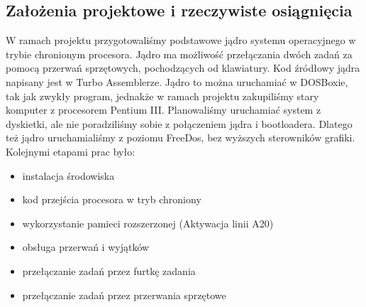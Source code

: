 \documentclass[a4paper,12pt]{article}
\begin{document}
		\subsection{Założenia projektowe i rzeczywiste osiągnięcia}
		W ramach projektu przygotowaliśmy podstawowe jądro systemu operacyjnego w trybie chronionym procesora. Jądro ma możliwość przełączania dwóch zadań za pomocą przerwań sprzętowych, pochodzących od klawiatury. Kod źródłowy jądra napisany jest w Turbo Assemblerze. Jądro to można uruchamiać w DOSBoxie, tak jak zwykły program, jednakże w ramach projektu zakupiliśmy stary komputer z procesorem Pentium III. Planowaliśmy uruchamiać system z dyskietki, ale nie poradziliśmy sobie z połączeniem jądra i bootloadera. Dlatego też jądro uruchamialiśmy z poziomu FreeDos, bez  wyższych sterowników grafiki. Kolejnymi etapami prac było:
			\begin{itemize}
				\item{instalacja środowiska}
				\item{kod przejścia procesora w tryb chroniony}
				\item{wykorzystanie pamieci rozszerzonej } (Aktywacja linii A20)
				\item{obsługa przerwań i wyjątków}
				\item{przełączanie zadań przez furtkę zadania }	
				\item{przełączanie zadań przez przerwania sprzętowe }	
			\end{itemize}
\end{document}
